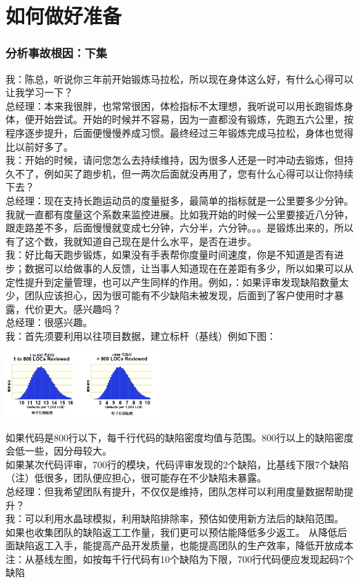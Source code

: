 \chapter{如何做好准备} %

\hypertarget{ux5206ux6790ux4e8bux6545ux6839ux56e0ux4e0bux96c6}{%
\subsection{分析事故根因：下集}\label{ux5206ux6790ux4e8bux6545ux6839ux56e0ux4e0bux96c6}}

我：陈总，听说你三年前开始锻炼马拉松，所以现在身体这么好，有什么心得可以让我学习一下？\\
总经理：本来我很胖，也常常很困，体检指标不太理想，我听说可以用长跑锻炼身体，便开始尝试。开始的时候并不容易，因为一直都没有锻炼，先跑五六公里，按程序逐步提升，后面便慢慢养成习惯。最终经过三年锻炼完成马拉松，身体也觉得比以前好多了。\\
我：开始的时候，请问您怎么去持续维持，因为很多人还是一时冲动去锻炼，但持久不了，例如买了跑步机，但一两次后面就没再用了，您有什么心得可以让你持续下去？\\
总经理：现在支持长跑运动员的度量挺多，最简单的指标就是一公里要多少分钟。我就一直都有度量这个系数来监控进展。比如我开始的时候一公里要接近八分钟，跟走路差不多，后面慢慢就变成七分钟，六分半，六分钟。。。是锻炼出来的，所以有了这个数，我就知道自己现在是什么水平，是否在进步。\\
我：好比每天跑步锻炼，如果没有手表帮你度量时间速度，你是不知道是否有进步；数据可以给做事的人反馈，让当事人知道现在在差距有多少，所以如果可以从定性提升到定量管理，也可以产生同样的作用。例如，：如果评审发现缺陷数量太少，团队应该担心，因为很可能有不少缺陷未被发现，后面到了客户使用时才暴露，代价更大。感兴趣吗？\\
总经理：很感兴趣。\\
我：首先须要利用以往项目数据，建立标杆（基线）例如下图：


\includegraphics[width=6cm]{微信截图_20230605130227.png}

如果代码是800行以下，每千行代码的缺陷密度均值与范围。800行以上的缺陷密度会低一些，因分母较大。\\
如果某次代码评审，700行的模块，代码评审发现的2个缺陷，比基线下限7个缺陷（注）低很多，团队便应担心，很可能存在不少缺陷未暴露。\\
总经理：但我希望团队有提升，不仅仅是维持，团队怎样可以利用度量数据帮助提升？\\
我：可以利用水晶球模拟，利用缺陷排除率，预估如使用新方法后的缺陷范围。\\
如果也收集团队的缺陷返工工作量，我们更可以预估能降低多少返工。
从降低后面缺陷返工入手，能提高产品开发质量，也能提高团队的生产效率，降低开放成本\\
注：从基线左图，如按每千行代码有10个缺陷为下限，700行代码便应发现起码7个缺陷

